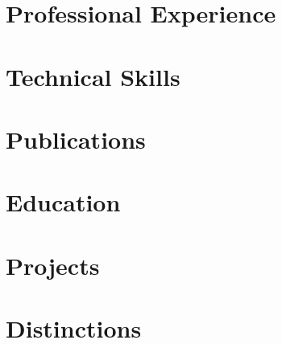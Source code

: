 \documentclass[letter,10pt]{article}
\begin{document}


\section{Professional Experience}



\section{Technical Skills}


\section{Publications}



\section{Education}


 \section{Projects}


\section{Distinctions}


%
\end{document}
